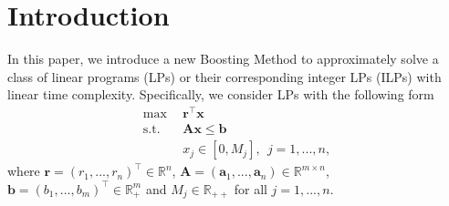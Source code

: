 \documentclass{article} %
\newcommand{\R}{\mathbb{R}}
\begin{document}
%

\section{Introduction}
In this paper, we introduce a new Boosting Method to approximately solve a class of linear programs (LPs) or their corresponding integer LPs (ILPs) with linear time complexity. Specifically, we consider LPs with the following form
\begin{align}
   \tag{LP} \max \ \ & \bm{r}^\top \bm{x} \label{eqn:LP}  \\
    \text{s.t. }\ & \bm{A} \bm{x} \le \bm{b} \nonumber  \\ 
    & x_j \in [0,M_j], \ \ j=1,...,n \nonumber,
\end{align}
where $\bm{r} = (r_1,...,r_n)^{\top} \in \R^n$, $\bm{A} = (\bm{a}_1,...,\bm{a}_n) \in \R^{m\times n}$, $\bm{b} = (b_1,...,b_m)^{\top} \in \R^m_{+}$ and $M_j\in\mathbb{R}_{++}$ for all $j=1,...,n$.
\end{document}
